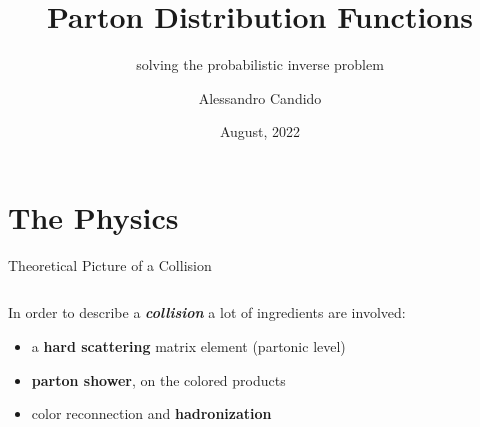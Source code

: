 \documentclass[9pt]{beamer}
\title{Parton Distribution Functions}
\subtitle{solving the probabilistic inverse problem}
\date{August, 2022}
\author{Alessandro Candido}
\begin{document}
\maketitle


\section{The Physics}

\begin{frame}{Theoretical Picture of a Collision}
    \begin{columns}
        \begin{column}{0.5\textwidth}
            In order to describe a \textit{\textbf{collision}} a lot of ingredients are
            involved:
            \begin{itemize}
                \item a \textbf{hard scattering} matrix element (partonic level)
                \item \textbf{parton shower}, on the colored products
                \item color reconnection and \textbf{hadronization}
            \end{itemize}


\end{column}
\end{columns}
\end{frame}
\end{document}
